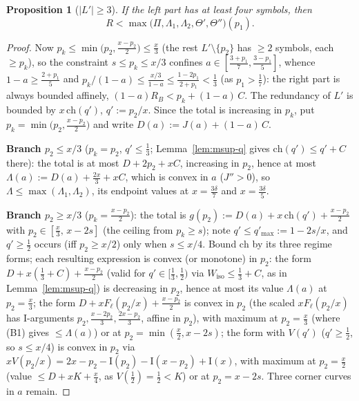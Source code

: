 \documentclass[journal]{IEEEtran}
\newtheorem{proposition}{Proposition}
\theoremstyle{definition}
\newcommand{\CC}{C}
\begin{document}
\begin{proposition}[$|L'|\ge3$]\label{prop:L3-q}
If the left part has at least four symbols, then
\[
  R<\max\bigl(\Pi,\Lambda_1,\Lambda_2,\Theta',\Theta''\bigr)(p_1).
\]
\end{proposition}

\begin{proof}
Now $p_k\le\min\bigl(p_2,\tfrac{x-p_2}2\bigr)\le\tfrac x3$ \textup{(}the
rest $L'\setminus\{p_2\}$ has $\ge2$ symbols, each $\ge p_k$\textup{)}, so
the constraint $s\le p_k\le x/3$ confines
$a\in[\tfrac{3+p_1}7,\tfrac{3-p_1}5]$, whence $1-a\ge\tfrac{2+p_1}5$ and
$p_k/(1-a)\le\tfrac{x/3}{1-a}\le\tfrac{1-2p_1}{2+p_1}<\tfrac13$
\textup{(}as $p_1>\tfrac17$\textup{)}: the right part is always bounded
affinely, $(1-a)R_B<p_k+(1-a)\,\CC$. The redundancy of $L'$ is bounded by
$x\,\mathrm{ch}(q')$, $q':=p_2/x$. Since the total is increasing in
$p_k$, put $p_k=\min\bigl(p_2,\tfrac{x-p_2}2\bigr)$ and write
$D(a):=J(a)+(1-a)\,\CC$.

\textbf{Branch $p_2\le x/3$} \textup{(}$p_k=p_2$, $q'\le\tfrac13$;
Lemma~\ref{lem:msup-q} gives $\mathrm{ch}(q')\le q'+\CC$ there\textup{)}:
the total is at most $D+2p_2+x\CC$, increasing in $p_2$, hence at most
$\Lambda(a):=D(a)+\tfrac{2x}3+x\CC$, which is convex in $a$
\textup{(}$J''>0$\textup{)}, so $\Lambda\le\max(\Lambda_1,\Lambda_2)$,
its endpoint values at $x=\tfrac{3\delta}7$ and $x=\tfrac{3\delta}5$.

\textbf{Branch $p_2\ge x/3$} \textup{(}$p_k=\tfrac{x-p_2}2$\textup{)}: the
total is $g(p_2):=D(a)+x\,\mathrm{ch}(q')+\tfrac{x-p_2}2$ with
$p_2\in[\tfrac x3,\,x-2s]$ \textup{(}the ceiling from
$p_k\ge s$\textup{)}; note $q'\le q'_{\max}:=1-2s/x$, and $q'\ge\tfrac12$
occurs \textup{(}iff $p_2\ge x/2$\textup{)} only when $s\le x/4$. Bound
$\mathrm{ch}$ by its three regime forms; each resulting expression is
convex (or monotone) in $p_2$:
the form $D+x(\tfrac13+\CC)+\tfrac{x-p_2}2$ \textup{(}valid for
$q'\in[\tfrac13,\tfrac12)$ via $W_{\mathrm{iso}}\le\tfrac13+\CC$, as in
Lemma~\ref{lem:msup-q}\textup{)} is decreasing in $p_2$, hence at most its
value $\Lambda(a)$ at $p_2=\tfrac x3$; the form
$D+xF_\ell(p_2/x)+\tfrac{x-p_2}2$ is convex in $p_2$ \textup{(}the scaled
$xF_\ell(p_2/x)$ has $\mathrm I$-arguments $p_2,\tfrac{x-2p_2}3,\tfrac{2x-p_2}3$,
affine in $p_2$\textup{)}, with maximum at $p_2=\tfrac x3$ \textup{(}where
\textup{(B1)} gives $\le\Lambda(a)$\textup{)} or at
$p_2=\min(\tfrac x2,x-2s)$; the form with $V(q')$
\textup{(}$q'\ge\tfrac12$, so $s\le x/4$\textup{)} is convex in $p_2$ via
$xV(p_2/x)=2x-p_2-\mathrm I(p_2)-\mathrm I(x-p_2)+\mathrm I(x)$, with maximum at
$p_2=\tfrac x2$ \textup{(}value $\le D+xK+\tfrac x4$, as
$V(\tfrac12)=\tfrac12<K$\textup{)} or at $p_2=x-2s$. Three corner curves
in $a$ remain.


\end{proof}
\end{document}
